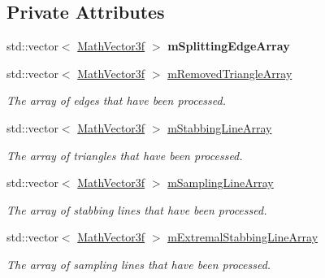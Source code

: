 \subsection*{Private Attributes}
\begin{DoxyCompactItemize}
\item 
\mbox{\label{classvisilib_1_1_helper_visual_debugger_a111e274dcc692b5a208ab913953121e7}} 
std\+::vector$<$ \mbox{\hyperlink{classvisilib_1_1_math_vector3__}{Math\+Vector3f}} $>$ {\bfseries m\+Splitting\+Edge\+Array}
\item 
std\+::vector$<$ \mbox{\hyperlink{classvisilib_1_1_math_vector3__}{Math\+Vector3f}} $>$ \mbox{\hyperlink{classvisilib_1_1_helper_visual_debugger_a7b0b03408531be35d083c6150c8e3d63}{m\+Removed\+Triangle\+Array}}
\begin{DoxyCompactList}\small\item\em The array of edges that have been processed. \end{DoxyCompactList}\item 
std\+::vector$<$ \mbox{\hyperlink{classvisilib_1_1_math_vector3__}{Math\+Vector3f}} $>$ \mbox{\hyperlink{classvisilib_1_1_helper_visual_debugger_a642e381b6e255a1ca570114fc4433a95}{m\+Stabbing\+Line\+Array}}
\begin{DoxyCompactList}\small\item\em The array of triangles that have been processed. \end{DoxyCompactList}\item 
std\+::vector$<$ \mbox{\hyperlink{classvisilib_1_1_math_vector3__}{Math\+Vector3f}} $>$ \mbox{\hyperlink{classvisilib_1_1_helper_visual_debugger_a9a39394f148771bb6aa197efceef971d}{m\+Sampling\+Line\+Array}}
\begin{DoxyCompactList}\small\item\em The array of stabbing lines that have been processed. \end{DoxyCompactList}\item 
std\+::vector$<$ \mbox{\hyperlink{classvisilib_1_1_math_vector3__}{Math\+Vector3f}} $>$ \mbox{\hyperlink{classvisilib_1_1_helper_visual_debugger_ab2d63d17fe8ef31d0798c2a42551a672}{m\+Extremal\+Stabbing\+Line\+Array}}
\begin{DoxyCompactList}\small\item\em The array of sampling lines that have been processed. \end{DoxyCompactList}\item 

\end{DoxyCompactItemize}
